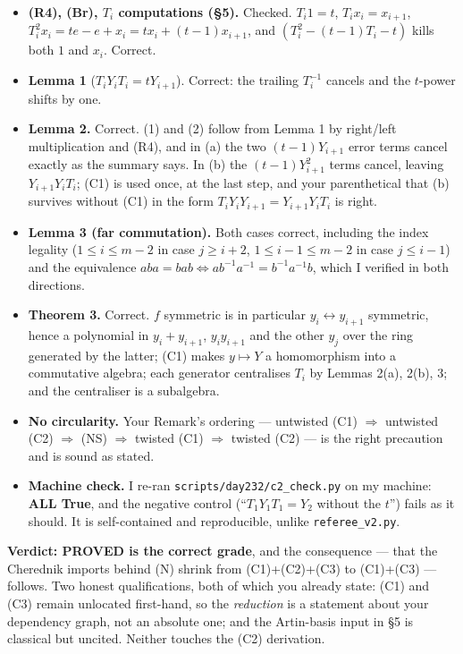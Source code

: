 \documentclass[11pt]{article}
\begin{document}
\begin{itemize}
  \item \textbf{(R4), (Br), $T_i$ computations (\S5).} Checked. $T_i1=t$, $T_ix_i=x_{i+1}$,
        $T_i^2x_i=te-e+x_i=tx_i+(t-1)x_{i+1}$, and
        $(T_i^2-(t-1)T_i-t)$ kills both $1$ and $x_i$. Correct.
  \item \textbf{Lemma 1} ($T_iY_iT_i=tY_{i+1}$). Correct: the trailing $T_i^{-1}$ cancels and
        the $t$-power shifts by one.
  \item \textbf{Lemma 2.} Correct. (1) and (2) follow from Lemma 1 by right/left multiplication
        and (R4), and in (a) the two $(t-1)Y_{i+1}$ error terms cancel exactly as the summary
        says. In (b) the $(t-1)Y_{i+1}^2$ terms cancel, leaving $Y_{i+1}Y_iT_i$; (C1) is used
        once, at the last step, and your parenthetical that (b) survives without (C1) in the form
        $T_iY_iY_{i+1}=Y_{i+1}Y_iT_i$ is right.
  \item \textbf{Lemma 3 (far commutation).} Both cases correct, including the index legality
        ($1\le i\le m-2$ in case $j\ge i+2$, $1\le i-1\le m-2$ in case $j\le i-1$) and the
        equivalence $aba=bab\iff ab^{-1}a^{-1}=b^{-1}a^{-1}b$, which I verified in both
        directions.
  \item \textbf{Theorem 3.} Correct. $f$ symmetric is in particular $y_i\leftrightarrow y_{i+1}$
        symmetric, hence a polynomial in $y_i+y_{i+1}$, $y_iy_{i+1}$ and the other $y_j$ over the
        ring generated by the latter; (C1) makes $y\mapsto Y$ a homomorphism into a commutative
        algebra; each generator centralises $T_i$ by Lemmas 2(a), 2(b), 3; and the centraliser is
        a subalgebra.
  \item \textbf{No circularity.} Your Remark's ordering --- untwisted (C1) $\Rightarrow$
        untwisted (C2) $\Rightarrow$ (NS) $\Rightarrow$ twisted (C1) $\Rightarrow$ twisted (C2)
        --- is the right precaution and is sound as stated.
  \item \textbf{Machine check.} I re-ran \texttt{scripts/day232/c2\_check.py} on my machine:
        \textbf{ALL True}, and the negative control (``$T_1Y_1T_1=Y_2$ without the $t$'')
        fails as it should. It is self-contained and reproducible, unlike
        \texttt{referee\_v2.py}.
\end{itemize}

\noindent\textbf{Verdict: PROVED is the correct grade}, and the consequence --- that the
Cherednik imports behind (N) shrink from (C1)+(C2)+(C3) to (C1)+(C3) --- follows. Two honest
qualifications, both of which you already state: (C1) and (C3) remain unlocated first-hand, so
the \emph{reduction} is a statement about your dependency graph, not an absolute one; and the
Artin-basis input in \S5 is classical but uncited. Neither touches the (C2) derivation.
\end{document}
